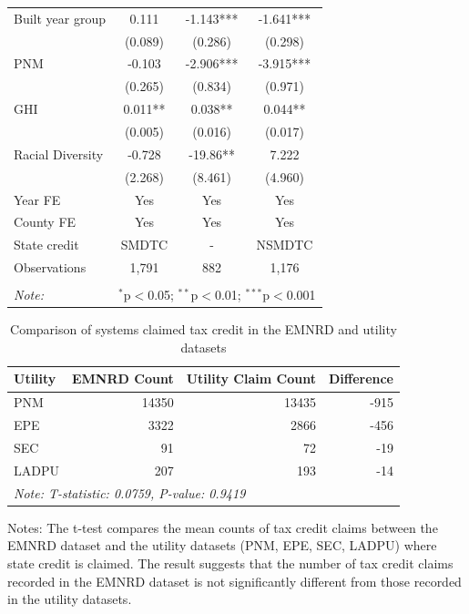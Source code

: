 \documentclass[11pt,twoside,letterpaper]{article}
\begin{document}
\begin{table}[H]
{\begin{tabular}{lccc}
Built year group & 0.111 & -1.143*** & -1.641*** \\
 & (0.089) & (0.286) & (0.298) \\
PNM & -0.103 & -2.906*** & -3.915*** \\
 & (0.265) & (0.834) & (0.971) \\
GHI & 0.011** & 0.038** & 0.044** \\
 & (0.005) & (0.016) & (0.017) \\
Racial Diversity & -0.728 & -19.86** & 7.222 \\
 & (2.268) & (8.461) & (4.960) \\ \cline{1-4}
Year FE & Yes & Yes & Yes \\
County FE & Yes & Yes & Yes \\
State credit & SMDTC & - & NSMDTC \\
Observations & 1,791 & 882 & 1,176 \\
\hline
\hline \\[-1.8ex]
\textit{Note:} & \multicolumn{3}{r}{$^{*}$p$<$0.05; $^{**}$p$<$0.01; $^{***}$p$<$0.001} \\
\end{tabular}}
\end{table}



\begin{table}[H] 
\caption{Comparison of systems claimed tax credit in the EMNRD and utility datasets}
\label{tab:compare_emnrd_utility}
\centering
\begin{tabular}{lrrr}
\toprule
Utility & EMNRD Count & Utility Claim Count & Difference \\
\midrule
PNM & 14350 & 13435 & -915 \\
EPE & 3322 & 2866 & -456 \\
SEC & 91 & 72 & -19 \\
LADPU & 207 & 193 & -14 \\
\bottomrule
\multicolumn{4}{l}{\textit{Note:  T-statistic: 0.0759, P-value: 0.9419}} \\
\end{tabular}


\begin{flushleft}\footnotesize{Notes: The t-test compares the mean counts of tax credit claims between the EMNRD dataset and the utility datasets (PNM, EPE, SEC, LADPU) where state credit is claimed. The result suggests that the number of tax credit claims recorded in the EMNRD dataset is not significantly different from those recorded in the utility datasets.}
\end{flushleft}
\end{table}
\end{document}
